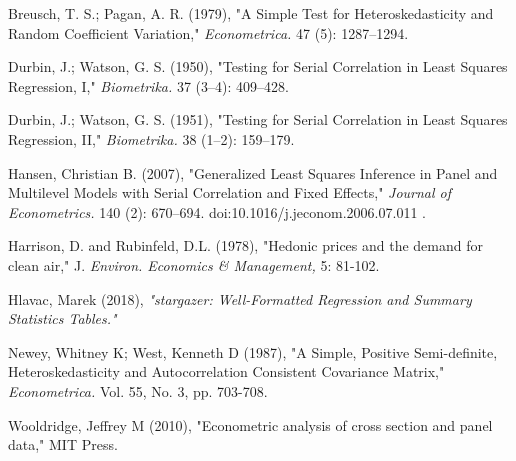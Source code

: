 \documentclass{article}
\theoremstyle{definition}
\begin{document}
\newpage
\begin{thebibliography}{99} 
	
	
	
	Breusch, T. S.; Pagan, A. R. (1979), "A Simple Test for Heteroskedasticity and Random Coefficient Variation," \textit{Econometrica.} 47 (5): 1287–1294.
	
	
	Durbin, J.; Watson, G. S. (1950), 
	"Testing for Serial Correlation in Least Squares Regression, I," \textit{Biometrika.} 37 (3–4): 409–428.
	
	Durbin, J.; Watson, G. S. (1951), "Testing for Serial Correlation in Least Squares Regression, II," \textit{Biometrika.} 38 (1–2): 159–179.
	
	Hansen, Christian B. (2007), "Generalized Least Squares Inference in Panel and Multilevel Models with Serial Correlation and Fixed Effects,"  \textit{Journal of Econometrics.} 140 (2): 670–694. doi:10.1016/j.jeconom.2006.07.011 .
	
	Harrison, D. and Rubinfeld, D.L. (1978), "Hedonic prices and the demand for clean air," J. \textit{Environ. Economics \& Management,} 5: 81-102.
	
	Hlavac, Marek (2018), 
	\textit{"stargazer: Well-Formatted Regression and Summary Statistics Tables."}
	
	
	Newey, Whitney K; West, Kenneth D (1987), "A Simple, Positive Semi-definite, Heteroskedasticity and Autocorrelation Consistent Covariance Matrix," \textit{Econometrica.}
	Vol. 55, No. 3, pp. 703-708.
	
	Wooldridge, Jeffrey M (2010), "Econometric analysis of cross section and panel data," MIT Press. 
	
		
\end{thebibliography}
 
\end{document}
